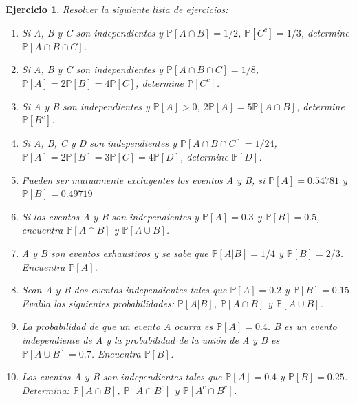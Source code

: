 \documentclass[12pt,twoside]{article}
\newtheorem{Ejer}{Ejercicio}
\newcommand{\Prob}{\mathbb{P}}
\begin{document}
\begin{Ejer} Resolver la siguiente lista de ejercicios:
\begin{enumerate}
\item Si A, B y C son independientes y $\Prob\left[A\cap B\right]=1/2$, $\Prob\left[C^{c}\right]=1/3$, determine $\Prob\left[A\cap B\cap C\right]$.

\item Si A, B y C son independientes y $\Prob\left[A\cap B\cap C\right]=1/8$, $\Prob\left[A\right]=2\Prob\left[B\right]=4\Prob\left[C\right]$, determine $\Prob\left[C^{c}\right]$.

\item Si A y B son independientes y $\Prob\left[A\right]>0$, $2\Prob\left[A\right]=5\Prob\left[A\cap B\right]$, determine $\Prob\left[B^{c}\right]$.

\item Si A, B, C y D son independientes y $\Prob\left[A\cap B\cap C\right]=1/24$, $\Prob\left[A\right]=2\Prob\left[B\right]=3\Prob\left[C\right]=4\Prob\left[D\right]$, determine $\Prob\left[D\right]$.

\item \'Pueden ser mutuamente excluyentes los eventos A y B, si $\Prob\left[A\right]=0.54781$ y $\Prob\left[B\right]=0.49719$

\item Si los eventos A y B son independientes y $\Prob\left[A\right]=0.3$ y $\Prob\left[B\right]=0.5$, encuentra $\Prob\left[A\cap B\right]$ y $\Prob\left[A\cup B\right]$.

\item A y B son eventos exhaustivos y se sabe que $\Prob\left[A|B\right]=1/4$ y $\Prob\left[B\right]=2/3$. Encuentra $\Prob\left[A\right]$.

\item Sean A y B dos eventos independientes tales que $\Prob\left[A\right]=0.2$ y $\Prob\left[B\right]=0.15$. Eval\'ua las siguientes probabilidades: $\Prob\left[A|B\right]$, $\Prob\left[A\cap B\right]$ y $\Prob\left[A\cup B\right]$.

\item La probabilidad de que un evento A ocurra es $\Prob\left[A\right]=0.4$. B es un evento independiente de A y la probabilidad de la uni\'on de A y B es $\Prob\left[A\cup B\right]=0.7$. Encuentra $\Prob\left[B\right]$.

\item Los eventos A y B son independientes tales que $\Prob\left[A\right]=0.4$ y $\Prob\left[B\right]=0.25$. Determina: $\Prob\left[A\cap B\right]$, $\Prob\left[A\cap B^{c}\right]$ y $\Prob\left[A^{c}\cap B^{c}\right]$.

\end{enumerate}
\end{Ejer}
\end{document}
